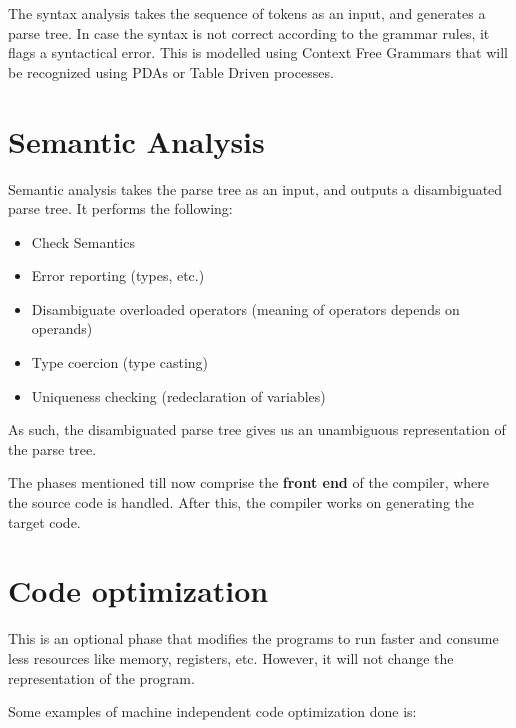 \documentclass[12pt,letterpaper]{amsbook}
\theoremstyle{definition}
\begin{document}
The syntax analysis takes the sequence of tokens as an input, and generates a parse tree. In case the syntax is not correct according to the grammar rules, it flags a syntactical error. This is modelled using Context Free Grammars that will be recognized using PDAs or Table Driven processes.

\section{Semantic Analysis}

Semantic analysis takes the parse tree as an input, and outputs a disambiguated parse tree. It performs the following:

\begin{itemize}
  \item Check Semantics
  \item Error reporting (types, etc.)
  \item Disambiguate overloaded operators (meaning of operators depends on operands)
  \item Type coercion (type casting)
  \item Uniqueness checking (redeclaration of variables)
\end{itemize}

As such, the disambiguated parse tree gives us an unambiguous representation of the parse tree.

The phases mentioned till now comprise the \textbf{front end} of the compiler, where the source code is handled. After this, the compiler works on generating the target code.

\section{Code optimization}

This is an optional phase that modifies the programs to run faster and consume less resources like memory, registers, etc. However, it will not change the representation of the program.

Some examples of machine independent code optimization done is:
\end{document}
